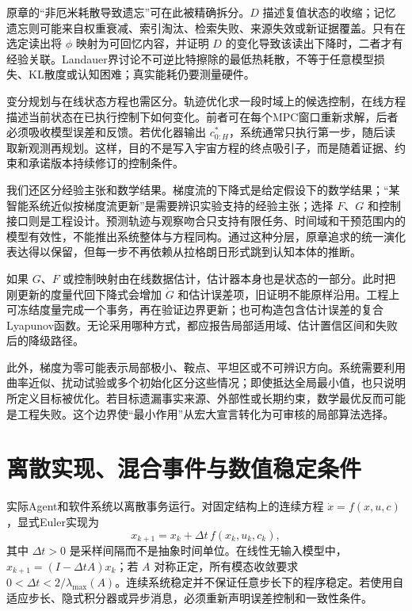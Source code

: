 原章的“非厄米耗散导致遗忘”可在此被精确拆分。$D$ 描述复值状态的收缩；记忆遗忘则可能来自权重衰减、索引淘汰、检索失败、来源失效或新证据覆盖。只有在选定读出将 $\phi$ 映射为可回忆内容，并证明 $D$ 的变化导致该读出下降时，二者才有经验关联。Landauer界讨论不可逆比特擦除的最低热耗散，不等于任意模型损失、KL散度或认知困难；真实能耗仍要测量硬件。

变分规划与在线状态方程也需区分。轨迹优化求一段时域上的候选控制，在线方程描述当前状态在已执行控制下如何变化。前者可在每个MPC窗口重新求解，后者必须吸收模型误差和反馈。若优化器输出 $c^*_{0:H}$，系统通常只执行第一步，随后读取新观测再规划。这样，目的不是写入宇宙方程的终点吸引子，而是随着证据、约束和承诺版本持续修订的控制条件。

我们还区分经验主张和数学结果。梯度流的下降式是给定假设下的数学结果；“某智能系统近似按梯度流更新”是需要辨识实验支持的经验主张；选择 $F$、$G$ 和控制接口则是工程设计。预测轨迹与观察吻合只支持有限任务、时间域和干预范围内的模型有效性，不能推出系统整体与方程同构。通过这种分层，原章追求的统一演化表达得以保留，但每一步不再依赖从拉格朗日形式跳到认知本体的推断。

如果 $G$、$F$ 或控制映射由在线数据估计，估计器本身也是状态的一部分。此时把刚更新的度量代回下降式会增加 $\dot G$ 和估计误差项，旧证明不能原样沿用。工程上可冻结度量完成一个事务，再在验证边界更新；也可构造包含估计误差的复合Lyapunov函数。无论采用哪种方式，都应报告局部适用域、估计置信区间和失败后的降级路径。

此外，梯度为零可能表示局部极小、鞍点、平坦区或不可辨识方向。系统需要利用曲率近似、扰动试验或多个初始化区分这些情况；即使抵达全局最小值，也只说明所定义目标被优化。若目标遗漏事实来源、外部性或长期约束，数学最优反而可能是工程失败。这个边界使“最小作用”从宏大宣言转化为可审核的局部算法选择。

\section{离散实现、混合事件与数值稳定条件}
\label{sec:evolution_discrete_implementation}

实际Agent和软件系统以离散事务运行。对固定结构上的连续方程 $\dot x=f(x,u,c)$，显式Euler实现为
\begin{equation}
 x_{k+1}=x_k+\Delta t\,f(x_k,u_k,c_k),
\end{equation}
其中 $\Delta t>0$ 是采样间隔而不是抽象时间单位。在线性无输入模型中，$x_{k+1}=(I-\Delta t A)x_k$；若 $A$ 对称正定，所有模态收敛要求 $0<\Delta t<2/\lambda_{\max}(A)$。连续系统稳定并不保证任意步长下的程序稳定。若使用自适应步长、隐式积分器或异步消息，必须重新声明误差控制和一致性条件。

